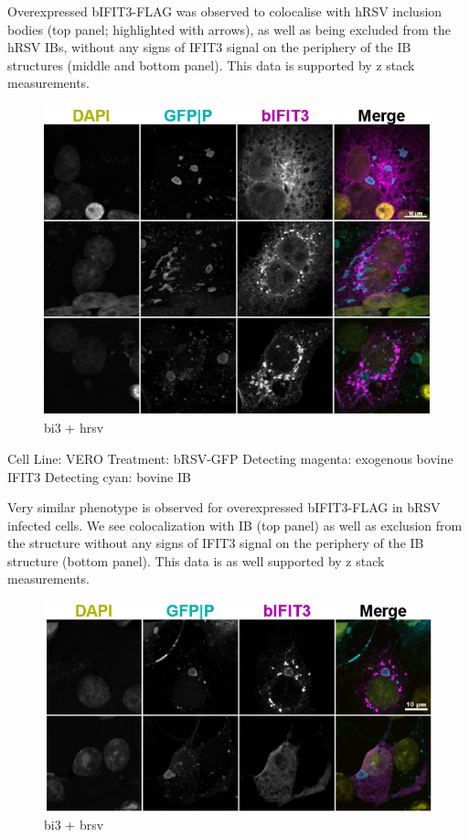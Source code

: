 Overexpressed bIFIT3-FLAG was observed to colocalise with hRSV inclusion bodies (top panel; highlighted with arrows), as well as being excluded from the hRSV IBs, without any signs of IFIT3 signal on the periphery of the IB structures (middle and bottom panel). This data is supported by z stack measurements.

\begin{figure}
    \centering
    \includegraphics[width=1\linewidth]{09. Chapter 4/Figs/04. Overexpression/02. bi3 hrsv.png}
    \caption[bi3 + hrsv]{bi3 + hrsv}
    \label{fig:bi3 + hrsv}
\end{figure}

Cell Line: VERO \newline
Treatment: bRSV-GFP \newline
Detecting magenta: exogenous bovine IFIT3 \newline
Detecting cyan: bovine IB \newline

Very similar phenotype is observed for overexpressed bIFIT3-FLAG in bRSV infected cells. We see colocalization with IB (top panel) as well as exclusion from the structure without any signs of IFIT3 signal on the periphery of the IB structure (bottom panel). This data is as well supported by z stack measurements.

\begin{figure}
    \centering
    \includegraphics[width=1\linewidth]{09. Chapter 4/Figs/04. Overexpression/03. bi3 brsv.png}
    \caption[bi3 + brsv]{bi3 + brsv}
    \label{fig:bi3 + brsv}
\end{figure}


